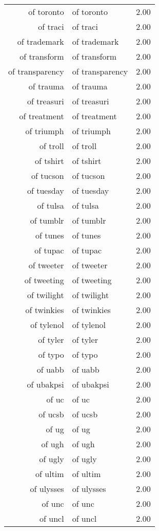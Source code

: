 \begin{table}[ht]
\begin{tabular}{rlr}
  of toronto & of toronto & 2.00 \\ 
  of traci & of traci & 2.00 \\ 
  of trademark & of trademark & 2.00 \\ 
  of transform & of transform & 2.00 \\ 
  of transparency & of transparency & 2.00 \\ 
  of trauma & of trauma & 2.00 \\ 
  of treasuri & of treasuri & 2.00 \\ 
  of treatment & of treatment & 2.00 \\ 
  of triumph & of triumph & 2.00 \\ 
  of troll & of troll & 2.00 \\ 
  of tshirt & of tshirt & 2.00 \\ 
  of tucson & of tucson & 2.00 \\ 
  of tuesday & of tuesday & 2.00 \\ 
  of tulsa & of tulsa & 2.00 \\ 
  of tumblr & of tumblr & 2.00 \\ 
  of tunes & of tunes & 2.00 \\ 
  of tupac & of tupac & 2.00 \\ 
  of tweeter & of tweeter & 2.00 \\ 
  of tweeting & of tweeting & 2.00 \\ 
  of twilight & of twilight & 2.00 \\ 
  of twinkies & of twinkies & 2.00 \\ 
  of tylenol & of tylenol & 2.00 \\ 
  of tyler & of tyler & 2.00 \\ 
  of typo & of typo & 2.00 \\ 
  of uabb & of uabb & 2.00 \\ 
  of ubakpsi & of ubakpsi & 2.00 \\ 
  of uc & of uc & 2.00 \\ 
  of ucsb & of ucsb & 2.00 \\ 
  of ug & of ug & 2.00 \\ 
  of ugh & of ugh & 2.00 \\ 
  of ugly & of ugly & 2.00 \\ 
  of ultim & of ultim & 2.00 \\ 
  of ulysses & of ulysses & 2.00 \\ 
  of unc & of unc & 2.00 \\ 
  of uncl & of uncl & 2.00 \\ 

\end{tabular}
\end{table}
